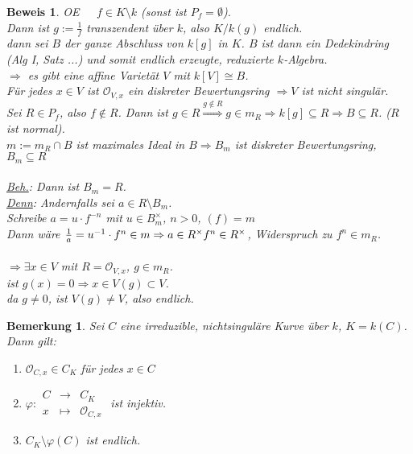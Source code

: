 \documentclass[a4paper,12pt]{report}
\theoremstyle{break}
\newtheorem{Bem}[Def]{Bemerkung}
\theoremstyle{nonumberbreak}
\theoremstyle{nonumberplain}
\newtheorem{Bew}{Beweis}
\newcommand{\Abb}[5]{\ensuremath{#1:\begin{array}{ccc} #2 & \longrightarrow & #3 \\ #4 & \longmapsto & #5 \end{array}}}
\renewcommand{\OE}{O\!\!E~}
\begin{document}
\begin{Bew}
\OE~~$f\in K\setminus k$ (sonst ist $P_f=\emptyset$).\\
Dann ist $g:=\frac{1}{f}$ transzendent über $k$, also $K/k(g)$ endlich.\\
dann sei $B$ der ganze Abschluss von $k[g]$ in $K$. $B$ ist dann ein Dedekindring (Alg I, Satz ...) und somit endlich erzeugte, reduzierte $k$-Algebra.\\
$\Rightarrow$ es gibt eine affine Varietät $V$ mit $k[V]\cong B$.\\
Für jedes $x\in V$ ist $\mathcal O_{V,x}$ ein diskreter Bewertungsring $\Rightarrow V$ ist nicht singulär.\\
Sei $R\in P_f$, also $f\notin R$. Dann ist $g\in R\stackrel{g\notin R}{\Rightarrow} g\in m_R\Rightarrow k[g]\subseteq R\Rightarrow B\subseteq R$.
($R$ ist normal). \\
$m:=m_R\cap B$ ist maximales Ideal in $B \Rightarrow B_m$ ist diskreter Bewertungsring, $B_m\subseteq R$\\\\
\underline{Beh.}: Dann ist $B_m=R$.\\
\underline{Denn}: Andernfalls sei $a\in R\setminus B_m$.\\
Schreibe $a=u\cdot f^{-n}$ mit $u\in B_m^\times$, $n>0$, $(f)=m$\\
Dann wäre $\frac{1}{a}=u^{-1}\cdot f^n\in m\Rightarrow a\in R^\times\\
f^n\in R^\times$, Widerspruch zu $f^n\in m_R$.\\
\\
$\Rightarrow\exists x\in V$ mit $R=\mathcal O_{V,x}$, $g\in m_R$.\\
ist $g(x)=0\Rightarrow x\in V(g)\subset V$.\\
da $g\neq 0$, ist $V(g)\neq V$, also endlich.
\end{Bew}

\begin{Bem}
\label{bem:18.2}
Sei $C$ eine irreduzible, nichtsinguläre Kurve über $k$, $K=k(C)$. Dann gilt:\\
\begin{enumerate}
\item $\mathcal O_{C,x}\in C_K$ für jedes $x\in C$
\item $\Abb{\varphi}{C}{C_K}{x}{\mathcal O_{C,x}}$ ist injektiv.
\item $C_K\setminus \varphi(C)$ ist endlich.
\end{enumerate}
\end{Bem}
\end{document}
